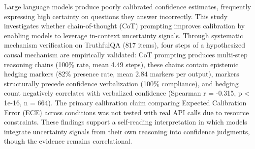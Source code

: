
Large language models produce poorly calibrated confidence estimates, frequently expressing high certainty on questions they answer incorrectly. This study investigates whether chain-of-thought (CoT) prompting improves calibration by enabling models to leverage in-context uncertainty signals. Through systematic mechanism verification on TruthfulQA (817 items), four steps of a hypothesized causal mechanism are empirically validated: CoT prompting produces multi-step reasoning chains (100\% rate, mean 4.49 steps), these chains contain epistemic hedging markers (82\% presence rate, mean 2.84 markers per output), markers structurally precede confidence verbalization (100\% compliance), and hedging count negatively correlates with verbalized confidence (Spearman r = -0.315, p < 1e-16, n = 664). The primary calibration claim comparing Expected Calibration Error (ECE) across conditions was not tested with real API calls due to resource constraints. These findings support a self-reading interpretation in which models integrate uncertainty signals from their own reasoning into confidence judgments, though the evidence remains correlational.
